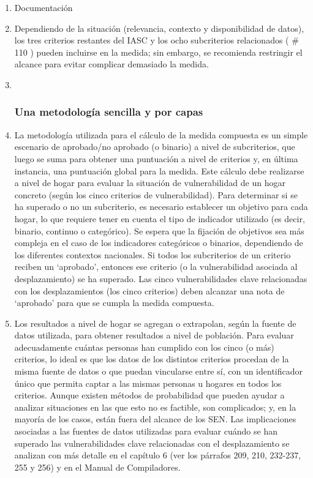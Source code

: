 \documentclass[
]{book}
\begin{document}
\begin{enumerate}
\def\labelenumi{\arabic{enumi}.}
\item
  Documentación
  \textbar{}
\item
  Dependiendo de la situación (relevancia, contexto y disponibilidad de datos), los tres criterios restantes del IASC y los ocho subcriterios relacionados (
  \# 110
  ) pueden incluirse en la medida; sin embargo, se recomienda restringir el alcance para evitar complicar demasiado la medida.
\item ~
  \hypertarget{una-metodologuxeda-sencilla-y-por-capas}{%
  \subsubsection{Una metodología sencilla y por capas}\label{una-metodologuxeda-sencilla-y-por-capas}}
\item
  La metodología utilizada para el cálculo de la medida compuesta es un simple escenario de aprobado/no aprobado (o binario) a nivel de subcriterios, que luego se suma para obtener una puntuación a nivel de criterios y, en última instancia, una puntuación global para la medida. Este cálculo debe realizarse a nivel de hogar para evaluar la situación de vulnerabilidad de un hogar concreto (según los cinco criterios de vulnerabilidad). Para determinar si se ha superado o no un subcriterio, es necesario establecer un objetivo para cada hogar, lo que requiere tener en cuenta el tipo de indicador utilizado (es decir, binario, continuo o categórico). Se espera que la fijación de objetivos sea más compleja en el caso de los indicadores categóricos o binarios, dependiendo de los diferentes contextos nacionales. Si todos los subcriterios de un criterio reciben un `aprobado', entonces ese criterio (o la vulnerabilidad asociada al desplazamiento) se ha superado. Las cinco vulnerabilidades clave relacionadas con los desplazamientos (los cinco criterios) deben alcanzar una nota de `aprobado' para que se cumpla la medida compuesta.
\item
  Los resultados a nivel de hogar se agregan o extrapolan, según la fuente de datos utilizada, para obtener resultados a nivel de población. Para evaluar adecuadamente cuántas personas han cumplido con los cinco (o más) criterios, lo ideal es que los datos de los distintos criterios procedan de la misma fuente de datos o que puedan vincularse entre sí, con un identificador único que permita captar a las mismas personas u hogares en todos los criterios. Aunque existen métodos de probabilidad que pueden ayudar a analizar situaciones en las que esto no es factible, son complicados; y, en la mayoría de los casos, están fuera del alcance de los SEN. Las implicaciones asociadas a las fuentes de datos utilizadas para evaluar cuándo se han superado las vulnerabilidades clave relacionadas con el desplazamiento se analizan con más detalle en el capítulo 6 (ver los párrafos 209, 210, 232-237, 255 y 256) y en el Manual de Compiladores.

\end{enumerate}
\end{document}
